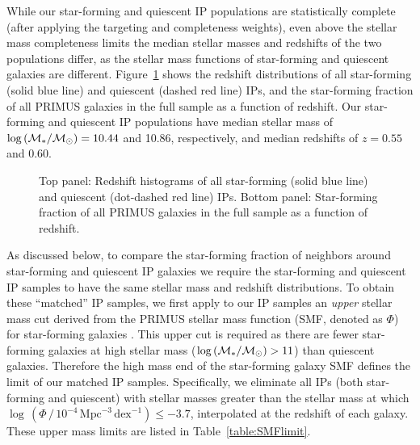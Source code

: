 While our star-forming and quiescent IP populations are statistically complete (after applying the targeting and completeness weights), even above the stellar mass completeness limits the median stellar masses and redshifts of the two populations differ, as the stellar mass functions of star-forming and quiescent galaxies are different.
Figure~\ref{fig:IPhist_latefrac_vs_z} shows the redshift distributions of all star-forming (solid blue line) and quiescent (dashed red line) IPs, and the star-forming fraction of all PRIMUS galaxies in the full sample as a function of redshift.
Our star-forming and quiescent IP populations have median stellar mass of $\logM=10.44$ and 10.86, respectively, and median redshifts of $z=0.55$ and 0.60.

\begin{figure}
  \epstrim{0.1in 0.1in 0.5in 0.8in}
  \caption{Top panel: Redshift histograms of all star-forming (solid blue line) and quiescent (dot-dashed red line) IPs.
Bottom panel: Star-forming fraction of all PRIMUS galaxies in the full sample as a function of redshift. 
}
  \label{fig:IPhist_latefrac_vs_z}
\end{figure}

As discussed below, to compare the star-forming fraction of neighbors around star-forming and quiescent IP galaxies we require the star-forming and quiescent IP samples to have the same stellar mass and redshift distributions.
To obtain these ``matched'' IP samples, we first apply to our IP samples an {\it upper} stellar mass cut derived from the PRIMUS stellar mass function (SMF, denoted as $\Phi$) for star-forming galaxies \citep{Moustakas13}.
This upper cut is required as there are fewer star-forming galaxies at high stellar mass ($\logM>11$) than quiescent galaxies.
Therefore the high mass end of the star-forming galaxy SMF defines the limit of our matched IP samples.  
Specifically, we eliminate all IPs (both star-forming and quiescent) with stellar masses greater than the stellar mass at which 
${\log\,(\Phi \,/\, 10^{-4}\,\text{Mpc}^{-3}\,\text{dex}^{-1}) \le -3.7}$, interpolated at the redshift of each galaxy.
These upper mass limits are listed in Table~\ref{table:SMFlimit}.



